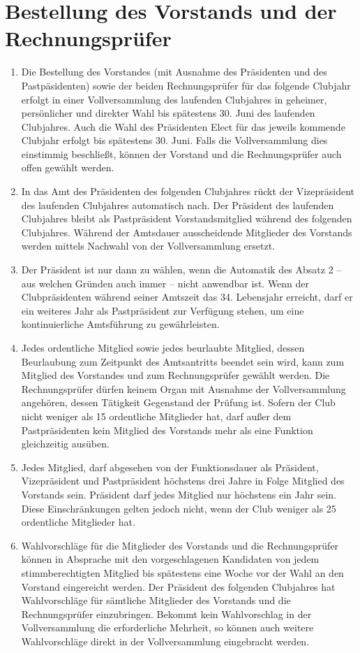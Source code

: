 \documentclass{article}
\begin{document}
\section{Bestellung des Vorstands und der Rechnungsprüfer}
\begin{enumerate}
    \item Die Bestellung des Vorstandes (mit Ausnahme des Präsidenten und des Pastpäsidenten) sowie der beiden Rechnungsprüfer für das folgende Clubjahr erfolgt in einer Vollversammlung des laufenden Clubjahres in geheimer, persönlicher und direkter Wahl bis spätestens 30. Juni des laufenden Clubjahres. Auch die Wahl des Präsidenten Elect für das jeweils kommende Clubjahr erfolgt bis spätestens 30. Juni. Falls die Vollversammlung dies einstimmig beschließt, können der Vorstand und die Rechnungsprüfer auch offen gewählt werden.
    \item In das Amt des Präsidenten des folgenden Clubjahres rückt der Vizepräsident des laufenden Clubjahres automatisch nach. Der Präsident des laufenden Clubjahres bleibt als Pastpräsident Vorstandsmitglied während des folgenden Clubjahres. Während der Amtsdauer ausscheidende Mitglieder des Vorstands werden mittels Nachwahl von der Vollversammlung ersetzt.
    \item Der Präsident ist nur dann zu wählen, wenn die Automatik des Absatz 2 -- aus welchen Gründen auch immer -- nicht anwendbar ist. Wenn der Clubpräsidenten während seiner Amtszeit das 34. Lebensjahr erreicht, darf er ein weiteres Jahr als Pastpräsident zur Verfügung stehen, um eine kontinuierliche Amtsführung zu gewährleisten.
    \item Jedes ordentliche Mitglied sowie jedes beurlaubte Mitglied, dessen Beurlaubung zum Zeitpunkt des Amtsantritts beendet sein wird, kann zum Mitglied des Vorstandes und zum Rechnungsprüfer gewählt werden. Die Rechnungsprüfer dürfen keinem Organ mit Ausnahme der Vollversammlung angehören, dessen Tätigkeit Gegenstand der Prüfung ist. Sofern der Club nicht weniger als 15 ordentliche Mitglieder hat, darf außer dem Pastpräsidenten kein Mitglied des Vorstands mehr als eine Funktion gleichzeitig ausüben.
    \item Jedes Mitglied, darf abgesehen von der Funktionsdauer als Präsident, Vizepräsident und Pastpräsident höchstens drei Jahre in Folge Mitglied des Vorstands sein. Präsident darf jedes Mitglied nur höchstens ein Jahr sein. Diese Einschränkungen gelten jedoch nicht, wenn der Club weniger als 25 ordentliche Mitglieder hat.
    \item Wahlvorschläge für die Mitglieder des Vorstands und die Rechnungsprüfer können in Absprache mit den vorgeschlagenen Kandidaten von jedem stimmberechtigten Mitglied bis spätestens eine Woche vor der Wahl an den Vorstand eingereicht werden. Der Präsident des folgenden Clubjahres hat Wahlvorschläge für sämtliche Mitglieder des Vorstands und die Rechnungsprüfer einzubringen. Bekommt kein Wahlvorschlag in der Vollversammlung die erforderliche Mehrheit, so können auch weitere Wahlvorschläge direkt in der Vollversammlung eingebracht werden.

\end{enumerate}
\end{document}
